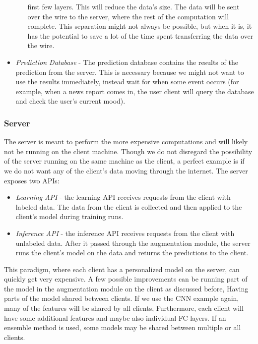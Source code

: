 \documentclass[../main.tex]{subfiles}
\begin{document}
\begin{itemize}
\begin{enumerate}[i]
                first few layers. This will reduce the data's size. The data will be sent over the wire to the server,
                where the rest of the computation will complete. This separation might not always be possible, but when it is, it has the potential
                to save a lot of the time spent transferring the data over the wire.
        \end{enumerate}
    \item \emph{Prediction Database} - The prediction database contains the results of the prediction from the server.
        This is necessary because we might not want to use the results immediately, instead wait for when some event occurs
        (for example, when a news report comes in, the user client will query the
        database and check the user's current mood).
\end{itemize}
 

\subsubsection{Server}

The server is meant to perform the more expensive computations and will likely not be running on the client machine.
Though we do not disregard the possibility of the server running on the same machine as the client,
a perfect example is if we do not want any of the client's data moving through the internet. The server exposes two APIs:

 
\begin{itemize}
    \item \emph{Learning API} - the learning API receives requests from the client with labeled data.
        The data from the client is collected and then applied to the client's model during training runs.
    \item \emph{Inference API} - the inference API receives requests from the client with unlabeled data. After it passed through the augmentation module,
        the server runs the client's model on the data and returns the predictions to the client.
\end{itemize}
 

This paradigm, where each client has a personalized model on the server, can quickly get very expensive.
A few possible improvements can be running part of the model in the augmentation module on the client as discussed before,
Having parts of the model shared between clients. If we use the CNN example again, many of the features will be shared by all clients,
Furthermore, each client will have some additional features and maybe also individual FC layers.
If an ensemble method is used, some models may be shared between multiple or all clients.
\end{document}
